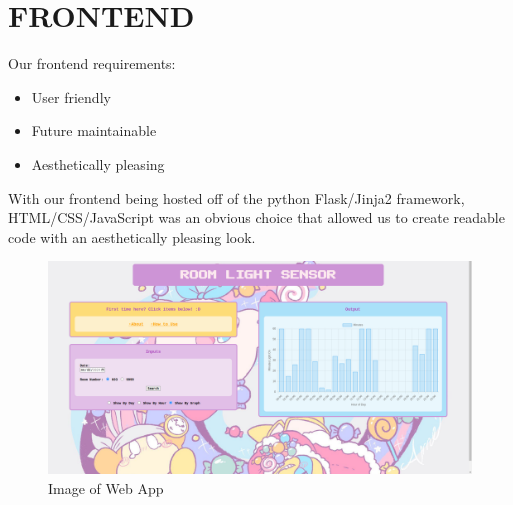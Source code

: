 \documentclass{article}
\begin{document}
\section{FRONTEND}
\begin{flushleft}
Our frontend requirements:
\begin{itemize}
  \item User friendly
  \item Future maintainable
  \item Aesthetically pleasing
\end{itemize}
With our frontend being hosted off of the python Flask/Jinja2 framework, HTML/CSS/JavaScript was an obvious choice that allowed us to create readable code with an aesthetically pleasing look.

\begin{figure}[H]


     

                        \includegraphics[height=.5\linewidth]{./media/Frontend.png}
                        \caption{Image of Web App}
     


\end{figure}

\end{flushleft}
\pagebreak
\end{document}
